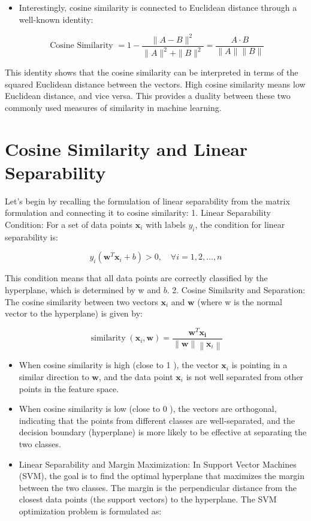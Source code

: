 \documentclass[
  12 pt,
  a4paper,
]{book}
\providecommand{\tightlist}{%
  \setlength{\itemsep}{0pt}\setlength{\parskip}{0pt}}
\numberwithin{equation}{section}
\theoremstyle{plain}      %
\theoremstyle{definition} %
\theoremstyle{remark}     %
\theoremstyle{note}         %
\begin{document}
\begin{itemize}
\tightlist
\item
  Interestingly, cosine similarity is connected to Euclidean distance
  through a well-known identity:
\end{itemize}

\[
\text { Cosine Similarity }=1-\frac{\|A-B\|^2}{\|A\|^2+\|B\|^2}= \frac{A \cdot B}{\|A\|\|B\|}
\]

This identity shows that the cosine similarity can be interpreted in
terms of the squared Euclidean distance between the vectors. High cosine
similarity means low Euclidean distance, and vice versa. This provides a
duality between these two commonly used measures of similarity in
machine learning.

\newpage

\hypertarget{cosine-similarity-and-linear-separability}{%
\section{Cosine Similarity and Linear
Separability}\label{cosine-similarity-and-linear-separability}}

Let's begin by recalling the formulation of linear separability from the
matrix formulation and connecting it to cosine similarity: 1. Linear
Separability Condition: For a set of data points \(\mathbf{x}_i\) with
labels \(y_i\), the condition for linear separability is:

\[
y_i\left(\mathbf{w}^T \mathbf{x}_i+b\right)>0, \quad \forall i=1,2, \ldots, n
\]

This condition means that all data points are correctly classified by
the hyperplane, which is determined by w and \(b\). 2. Cosine Similarity
and Separation: The cosine similarity between two vectors
\(\mathbf{x}_i\) and \(\mathbf{w}\) (where w is the normal vector to the
hyperplane) is given by:

\[
\operatorname{similarity}\left(\mathbf{x}_i, \mathbf{w}\right)=\frac{\mathbf{w}^T \mathbf{x}_{\mathbf{i}}}{\|\mathbf{w}\|\left\|\mathbf{x}_i\right\|}
\]

\begin{itemize}
\tightlist
\item
  When cosine similarity is high (close to 1 ), the vector
  \(\mathbf{x}_i\) is pointing in a similar direction to \(\mathbf{w}\),
  and the data point \(\mathbf{x}_i\) is not well separated from other
  points in the feature space.
\item
  When cosine similarity is low (close to 0 ), the vectors are
  orthogonal, indicating that the points from different classes are
  well-separated, and the decision boundary (hyperplane) is more likely
  to be effective at separating the two classes.
\item
  Linear Separability and Margin Maximization: In Support Vector
  Machines (SVM), the goal is to find the optimal hyperplane that
  maximizes the margin between the two classes. The margin is the
  perpendicular distance from the closest data points (the support
  vectors) to the hyperplane. The SVM optimization problem is formulated
  as:
\end{itemize}
\end{document}
